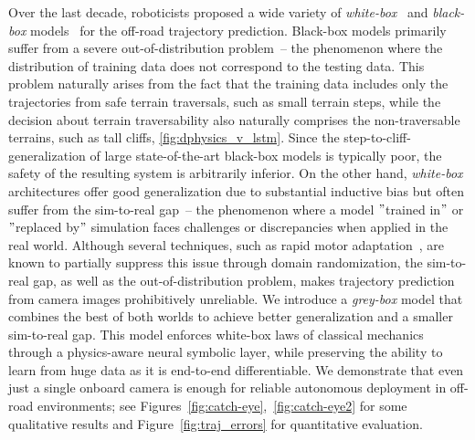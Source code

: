 Over the last decade,
roboticists proposed a wide variety of \emph{white-box}~\cite{Fabian2020, Dogru-AuRo-2021, manoharan-IROS-2024}
and \emph{black-box} models~\cite{loquercio-ICRA-2023, Niu-FRAI-2023, Wellhausen-RAL-2019, hdif2023, kahn2020badgr} for the off-road trajectory prediction.
Black-box models primarily suffer from a severe out-of-distribution problem~-- the phenomenon
where the distribution of training data does not correspond to the testing data.
This problem naturally arises from the fact that the training data includes only the trajectories from safe
terrain traversals, such as small terrain steps, while the decision about terrain traversability also naturally
comprises the non-traversable terrains, such as tall cliffs, \autoref{fig:dphysics_v_lstm}.
Since the step-to-cliff-generalization of large state-of-the-art black-box models is typically poor,
the safety of the resulting system is arbitrarily inferior.
On the other hand, \emph{white-box} architectures offer good generalization due to substantial inductive bias
but often suffer from the sim-to-real gap~-- the phenomenon where a model \("\)trained in\("\) or \("\)replaced by\("\)
simulation faces challenges or discrepancies when applied in the real world.
Although several techniques, such as rapid motor adaptation~\cite{rma-2021}, are known to partially suppress this issue
through domain randomization, the sim-to-real gap, as well as the out-of-distribution problem,
makes trajectory prediction from camera images prohibitively unreliable.
We introduce a \emph{grey-box} model that combines the best of both worlds to achieve better generalization and a smaller sim-to-real gap.
This model enforces white-box laws of classical mechanics through a physics-aware neural symbolic layer,
while preserving the ability to learn from huge data as it is end-to-end differentiable.
We demonstrate that even just a single onboard camera is enough for reliable autonomous deployment in off-road environments; see Figures~\ref{fig:catch-eye},~\ref{fig:catch-eye2} for some qualitative results and Figure~\ref{fig:traj_errors} for quantitative evaluation.


